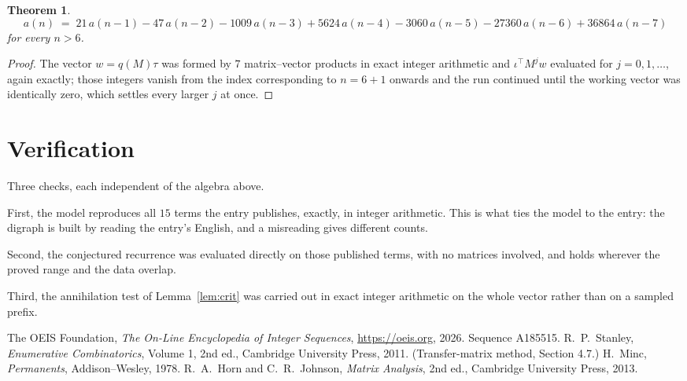 \documentclass[11pt,a4paper]{article}
\theoremstyle{plain}
\newtheorem{theorem}{Theorem}
\theoremstyle{definition}
\begin{document}
\begin{theorem}
\[
a(n)\;=\;21\,a(n-1) - 47\,a(n-2) - 1009\,a(n-3) + 5624\,a(n-4) - 3060\,a(n-5) - 27360\,a(n-6) + 36864\,a(n-7)
\]
for every $n>6$.
\end{theorem}

\begin{proof}
The vector $w=q(M)\tau$ was formed by $7$ matrix--vector products in exact integer
arithmetic and $\iota^{\!\top}M^{j}w$ evaluated for $j=0,1,\dots$, again exactly; those
integers vanish from the index corresponding to $n=6+1$ onwards and the run continued
until the working vector was identically zero, which settles every larger $j$ at once.
\end{proof}

\section{Verification}

Three checks, each independent of the algebra above.

First, the model reproduces all $15$ terms the entry publishes, exactly, in integer
arithmetic. This is what ties the model to the entry: the digraph is built by reading the
entry's English, and a misreading gives different counts.

Second, the conjectured recurrence was evaluated directly on those published terms, with no
matrices involved, and holds wherever the proved range and the data overlap.

Third, the annihilation test of Lemma~\ref{lem:crit} was carried out in exact integer
arithmetic on the whole vector rather than on a sampled prefix.

\begin{thebibliography}{9}
 The OEIS Foundation, \emph{The On-Line Encyclopedia of Integer
Sequences}, \url{https://oeis.org}, 2026. Sequence A185515.
 R.~P.~Stanley, \emph{Enumerative Combinatorics}, Volume 1, 2nd ed.,
Cambridge University Press, 2011. (Transfer-matrix method, Section 4.7.)
 H.~Minc, \emph{Permanents}, Addison--Wesley, 1978.
 R.~A.~Horn and C.~R.~Johnson, \emph{Matrix Analysis}, 2nd ed., Cambridge
University Press, 2013.
\end{thebibliography}
\end{document}
